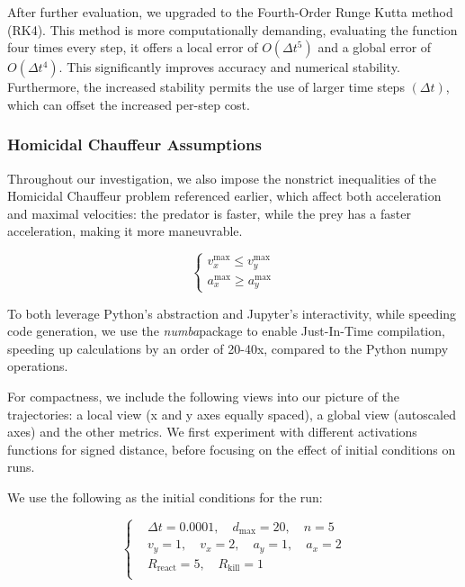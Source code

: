 \documentclass[10pt, twocolumn]{article}
\begin{document}
    After further evaluation, we upgraded to the Fourth-Order Runge Kutta method (RK4). This method is more computationally demanding, evaluating the function four times every step, it offers a local error of $O(\Delta t^5)$ and a global error of $O(\Delta t^4)$. This significantly improves accuracy and numerical stability. Furthermore, the increased stability permits the use of larger time steps $(\Delta t)$, which can offset the increased per-step cost.

    \subsubsection{Homicidal Chauffeur Assumptions}
    Throughout our investigation, we also impose the nonstrict inequalities of the Homicidal Chauffeur problem referenced earlier, which affect both acceleration and maximal velocities: the predator is faster, while the prey has a faster acceleration, making it more maneuvrable.

    \[
      \left\{
        \begin{aligned}
          v^{\text{max}}_x \leq v^{\text{max}}_y \\
          a^{\text{max}}_x \geq a^{\text{max}}_y
        \end{aligned}
        \right.
      \]

      To both leverage Python's abstraction and Jupyter's interactivity, while speeding code generation, we use the \textit{numba}package to enable Just-In-Time compilation, speeding up calculations by an order of 20-40x, compared to the Python numpy operations.

      For compactness, we include the following views into our picture of the trajectories: a local view (x and y axes equally spaced), a global view (autoscaled axes) and the other metrics. We first experiment with different activations functions for signed distance, before focusing on the effect of initial conditions on runs.

      We use the following as the initial conditions for the run:

      \[
        \left\{
          \begin{aligned}
            &\Delta t = 0.0001,\quad d_{\text{max}} = 20,\quad n = 5 \\
            &v_y = 1, \quad v_x = 2, \quad a_y = 1, \quad a_x = 2 \\
            &R_{\text{react}} = 5,\quad R_{\text{kill}} = 1 \\
          \end{aligned}
          \right.
        \]
\end{document}

